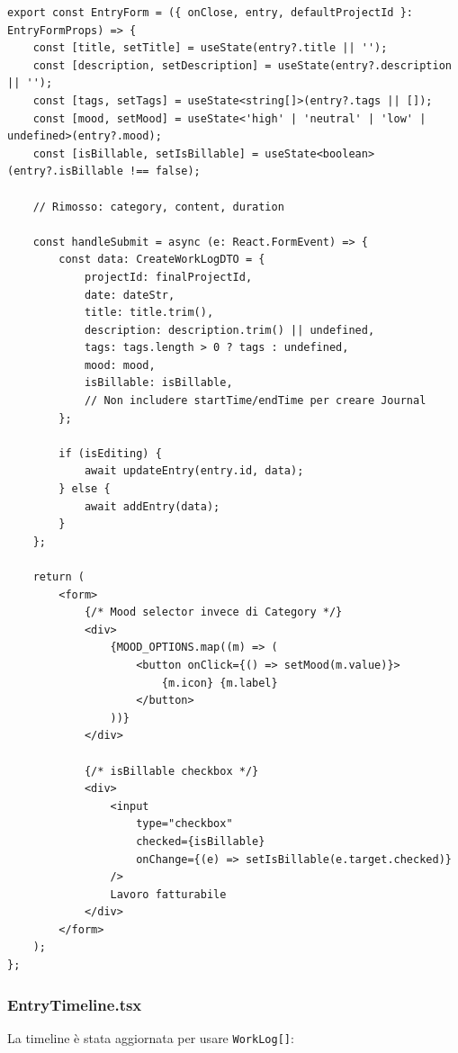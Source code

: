 \documentclass[11pt,a4paper]{article}
\begin{document}
\begin{lstlisting}[caption=EntryForm Aggiornato]
export const EntryForm = ({ onClose, entry, defaultProjectId }: EntryFormProps) => {
    const [title, setTitle] = useState(entry?.title || '');
    const [description, setDescription] = useState(entry?.description || '');
    const [tags, setTags] = useState<string[]>(entry?.tags || []);
    const [mood, setMood] = useState<'high' | 'neutral' | 'low' | undefined>(entry?.mood);
    const [isBillable, setIsBillable] = useState<boolean>(entry?.isBillable !== false);
    
    // Rimosso: category, content, duration
    
    const handleSubmit = async (e: React.FormEvent) => {
        const data: CreateWorkLogDTO = {
            projectId: finalProjectId,
            date: dateStr,
            title: title.trim(),
            description: description.trim() || undefined,
            tags: tags.length > 0 ? tags : undefined,
            mood: mood,
            isBillable: isBillable,
            // Non includere startTime/endTime per creare Journal
        };
        
        if (isEditing) {
            await updateEntry(entry.id, data);
        } else {
            await addEntry(data);
        }
    };
    
    return (
        <form>
            {/* Mood selector invece di Category */}
            <div>
                {MOOD_OPTIONS.map((m) => (
                    <button onClick={() => setMood(m.value)}>
                        {m.icon} {m.label}
                    </button>
                ))}
            </div>
            
            {/* isBillable checkbox */}
            <div>
                <input
                    type="checkbox"
                    checked={isBillable}
                    onChange={(e) => setIsBillable(e.target.checked)}
                />
                Lavoro fatturabile
            </div>
        </form>
    );
};
\end{lstlisting}

\subsubsection{EntryTimeline.tsx}

La timeline è stata aggiornata per usare \texttt{WorkLog[]}:
\end{document}

